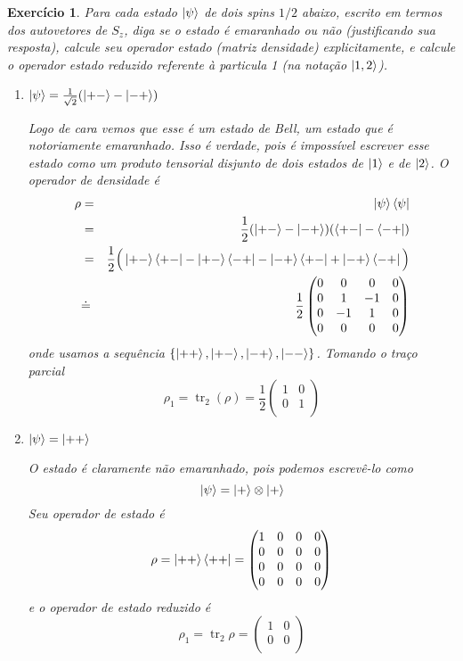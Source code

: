 \documentclass[12pt]{article}
\def\be{\begin{equation}}
\def\ee{\end{equation}}
\def\bea{\begin{eqnarray*}}
\def\eea{\end{eqnarray*}}
\def\f{\frac}
\newtheorem{exercise}{Exercício}
\DeclareMathOperator{\tr}{tr}
\begin{document}
	\begin{exercise}
		Para cada estado $\ket{\psi}$ de dois spins $1/2$ abaixo, escrito em termos dos autovetores de $S_z$, diga se o estado é emaranhado ou não (justificando sua 		resposta), calcule seu operador estado (matriz densidade) explicitamente, e calcule
		o operador estado reduzido referente à particula 1 (na notação $\ket{1, 2}$).
		\begin{enumerate}
			\item $ \ket{\psi} = \f{1}{\sqrt{2}} (\ket{+-} - \ket{-+}) $
			\begin{multianswer}
				Logo de cara vemos que esse é um estado de Bell, um estado que é notoriamente emaranhado. Isso é verdade, pois é impossível escrever esse estado como um produto tensorial disjunto de dois estados de $\ket{1}$ e de $\ket{2}$. O operador de densidade é
				\bea
					\rho &=& \ket{\psi}\bra{\psi} \\
						&=& \f{1}{2} (\ket{+-} - \ket{-+}) (\bra{+-} - \bra{-+}) \\
						&=& \f{1}{2}\Big( \ket{+-}\bra{+-} - \ket{+-}\bra{-+} - \ket{-+}\bra{+-} + \ket{-+}\bra{-+} \Big) \\
						&\dot{=}& \f{1}{2}
						\begin{pmatrix}
							0 & 0 & 0 & 0 \\
							0 & 1 & -1 & 0 \\
							0 & -1 & 1 & 0 \\
							0 & 0 & 0 & 0 \\
						\end{pmatrix}
				\eea
				onde usamos a sequência $\{ \ket{++}, \ket{+-}, \ket{-+}, \ket{--} \}$. Tomando o traço parcial 
				\be
					\rho_1 = \tr_2(\rho) = \f{1}{2}
					\begin{pmatrix}
						1 & 0 \\
						0 & 1 \\
					\end{pmatrix}
				\ee
			\end{multianswer}
			
			\item $ \ket{\psi} = \ket{++} $
			\begin{multianswer}
				O estado é claramente não emaranhado, pois podemos escrevê-lo como 
				\be
					\ket{\psi} = \ket{+} \otimes \ket{+}
				\ee
				Seu operador de estado é
				\be
					\rho = \ket{++}\bra{++} = 
					\begin{pmatrix}
						1 & 0 & 0 & 0 \\
						0 & 0 & 0 & 0 \\
						0 & 0 & 0 & 0 \\
						0 & 0 & 0 & 0 \\
					\end{pmatrix}
				\ee
				e o operador de estado reduzido é
				\be
					\rho_1 = \tr_2\rho = 
					\begin{pmatrix}
						1 & 0 \\
						0 & 0 \\
					\end{pmatrix}
				\ee
			\end{multianswer}
			

\end{enumerate}
\end{exercise}
\end{document}
